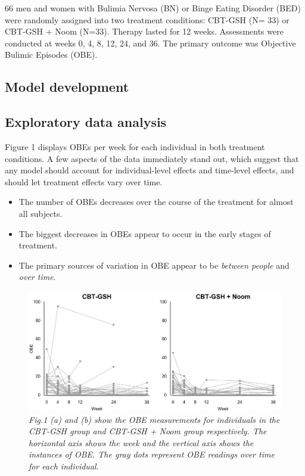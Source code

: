 \documentclass{article}
\begin{document}
66 men and women with Bulimia Nervosa (BN) or Binge Eating Disorder (BED) were randomly assigned into two treatment conditions: CBT-GSH (N= 33) or CBT-GSH + Noom (N=33).  Therapy lasted for 12 weeks.  Assessments were conducted at weeks 0, 4, 8, 12, 24, and 36.  The primary outcome was Objective Bulimic Episodes (OBE).  

\subsection{Model development}
\subsection*{Exploratory data analysis}
Figure 1 displays OBEs per week for each individual in both treatment conditions.  A few aspects of the data immediately stand out, which suggest that any model should account for individual-level effects and time-level effects, and should let treatment effects vary over time.  
\begin{itemize}
\item{The number of OBEs decreases over the course of the treatment for almost all subjects.}
\item{The biggest decreases in OBEs appear to occur in the early stages of treatment.}
\item{The primary sources of variation in OBE appear to be \emph{between people} and \emph{over time}.}
\end{itemize}
%
\begin{figure}[H]
   \begin{center}
\includegraphics[width=\textwidth, height=\textheight, keepaspectratio]{Noom_paths.png}
   \end{center}
\caption{\emph{Fig.1 (a) and (b) show the OBE measurements for individuals in the CBT-GSH group and CBT-GSH + Noom group respectively. The horizontal axis shows the week and the vertical axis shows the instances of OBE. The gray dots represent OBE readings over time for each individual. }}
\end{figure}
\end{document}
